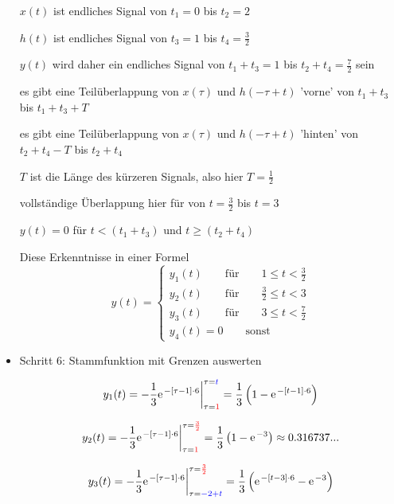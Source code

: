 \documentclass[11pt,a4paper,DIV=12]{scrartcl}
\numberwithin{equation}{section}
\numberwithin{figure}{section}
\newcommand{\red}{\textcolor{red}}
\newcommand{\blue}{\textcolor{blue}}
\begin{document}
\begin{ExCalc}
\begin{itemize}
  $x(t)$ ist endliches Signal von $t_1=0$ bis $t_2=2$

  $h(t)$ ist endliches Signal von $t_3=1$ bis $t_4=\frac{3}{2}$

  $y(t)$ wird daher ein endliches Signal von $t_1+t_3=1$ bis $t_2+t_4=\frac{7}{2}$ sein

  es gibt eine Teilüberlappung von $x(\tau)$ und $h(-\tau+t)$  'vorne' von
  $t_1+t_3$ bis $t_1+t_3+T$

  es gibt eine Teilüberlappung von $x(\tau)$ und $h(-\tau+t)$  'hinten' von
  $t_2+t_4-T$ bis $t_2+t_4$

  $T$ ist die Länge des kürzeren Signals, also hier $T=\frac{1}{2}$

  vollständige Überlappung hier für von $t = \frac{3}{2}$ bis $t=3$

  $y(t)=0$ für $t<(t_1+t_3)$ und $t\geq(t_2+t_4)$

  Diese Erkenntnisse in einer Formel
  \begin{equation}
  y(t) =
  \begin{cases}
    y_1(t) \qquad \mathrm{für} \qquad 1 \leq t < \frac{3}{2}\\
    y_2(t) \qquad \mathrm{für} \qquad \frac{3}{2} \leq t < 3\\
    y_3(t) \qquad \mathrm{für} \qquad 3 \leq t < \frac{7}{2}\\
    y_4(t)=0 \qquad \mathrm{sonst}
  \end{cases}
  \end{equation}

  \item Schritt 6:  Stammfunktion mit Grenzen auswerten

  \begin{equation}
  y_1(t) = -\frac{1}{3}\e^{-[\tau-1]\cdot 6}\bigg|_{\tau=\red{1}}^{\tau=\blue{t}}
  = \frac{1}{3}\left(1-\e^{-[t-1] \cdot 6}\right)
  \end{equation}

  \begin{equation}
  y_2(t) = -\frac{1}{3}\e^{-[\tau-1]\cdot 6}\bigg|_{\tau=\red{1}}^{\tau=\red{\frac{3}{2}}}  =
  \frac{1}{3}\left(1-\e^{-3}\right) \approx 0.316737...
  \end{equation}

  \begin{equation}
  y_3(t) = -\frac{1}{3}\e^{-[\tau-1]\cdot 6}\bigg|_{\tau=\blue{-2+t}}^{\tau=\red{\frac{3}{2}}} =
  \frac{1}{3}\left(\e^{-[t-3] \cdot 6} - \e^{-3}\right)
  \end{equation}
\end{itemize}
\end{ExCalc}
\end{document}
